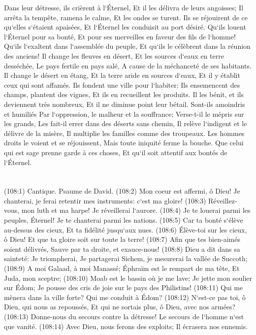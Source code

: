 \verse Dans leur détresse, ils crièrent à l`Éternel, Et il les délivra de leurs angoisses; 
\verse Il arrêta la tempête, ramena le calme, Et les ondes se turent. 
\verse Ils se réjouirent de ce qu`elles s`étaient apaisées, Et l`Éternel les conduisit au port désiré. 
\verse Qu`ils louent l`Éternel pour sa bonté, Et pour ses merveilles en faveur des fils de l`homme! 
\verse Qu`ils l`exaltent dans l`assemblée du peuple, Et qu`ils le célèbrent dans la réunion des anciens! 
\verse Il change les fleuves en désert, Et les sources d`eaux en terre desséchée, 
\verse Le pays fertile en pays salé, A cause de la méchanceté de ses habitants. 
\verse Il change le désert en étang, Et la terre aride en sources d`eaux, 
\verse Et il y établit ceux qui sont affamés. Ils fondent une ville pour l`habiter; 
\verse Ils ensemencent des champs, plantent des vignes, Et ils en recueillent les produits. 
\verse Il les bénit, et ils deviennent très nombreux, Et il ne diminue point leur bétail. 
\verse Sont-ils amoindris et humiliés Par l`oppression, le malheur et la souffrance; 
\verse Verse-t-il le mépris sur les grands, Les fait-il errer dans des déserts sans chemin, 
\verse Il relève l`indigent et le délivre de la misère, Il multiplie les familles comme des troupeaux. 
\verse Les hommes droits le voient et se réjouissent, Mais toute iniquité ferme la bouche. 
\verse Que celui qui est sage prenne garde à ces choses, Et qu`il soit attentif aux bontés de l`Éternel. 

\chapter{}

\verse (108:1) Cantique. Psaume de David. (108:2) Mon coeur est affermi, ô Dieu! Je chanterai, je ferai retentir mes instruments: c`est ma gloire! 
\verse (108:3) Réveillez-vous, mon luth et ma harpe! Je réveillerai l`aurore. 
\verse (108:4) Je te louerai parmi les peuples, Éternel! Je te chanterai parmi les nations. 
\verse (108:5) Car ta bonté s`élève au-dessus des cieux, Et ta fidélité jusqu`aux nues. 
\verse (108:6) Élève-toi sur les cieux, ô Dieu! Et que ta gloire soit sur toute la terre! 
\verse (108:7) Afin que tes bien-aimés soient délivrés, Sauve par ta droite, et exauce-nous! 
\verse (108:8) Dieu a dit dans sa sainteté: Je triompherai, Je partagerai Sichem, je mesurerai la vallée de Succoth; 
\verse (108:9) A moi Galaad, à moi Manassé; Éphraïm est le rempart de ma tête, Et Juda, mon sceptre; 
\verse (108:10) Moab est le bassin où je me lave; Je jette mon soulier sur Édom; Je pousse des cris de joie sur le pays des Philistins! 
\verse (108:11) Qui me mènera dans la ville forte? Qui me conduit à Édom? 
\verse (108:12) N`est-ce pas toi, ô Dieu, qui nous as repoussés, Et qui ne sortais plus, ô Dieu, avec nos armées? 
\verse (108:13) Donne-nous du secours contre la détresse! Le secours de l`homme n`est que vanité. 
\verse (108:14) Avec Dieu, nous ferons des exploits; Il écrasera nos ennemis. 

